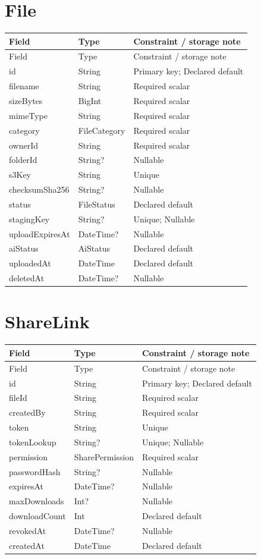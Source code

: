 \documentclass[11pt,a4paper,oneside]{report}
\begin{document}
\section{File}
\begin{longtable}{p{.31\linewidth}p{.23\linewidth}p{.36\linewidth}}\toprule Field&Type&Constraint / storage note\\\midrule\endfirsthead\toprule Field&Type&Constraint / storage note\\\midrule\endhead
id&String&Primary key; Declared default\\
filename&String&Required scalar\\
sizeBytes&BigInt&Required scalar\\
mimeType&String&Required scalar\\
category&FileCategory&Required scalar\\
ownerId&String&Required scalar\\
folderId&String?&Nullable\\
s3Key&String&Unique\\
checksumSha256&String?&Nullable\\
status&FileStatus&Declared default\\
stagingKey&String?&Unique; Nullable\\
uploadExpiresAt&DateTime?&Nullable\\
aiStatus&AiStatus&Declared default\\
uploadedAt&DateTime&Declared default\\
deletedAt&DateTime?&Nullable\\
\bottomrule\end{longtable}

\section{ShareLink}
\begin{longtable}{p{.31\linewidth}p{.23\linewidth}p{.36\linewidth}}\toprule Field&Type&Constraint / storage note\\\midrule\endfirsthead\toprule Field&Type&Constraint / storage note\\\midrule\endhead
id&String&Primary key; Declared default\\
fileId&String&Required scalar\\
createdBy&String&Required scalar\\
token&String&Unique\\
tokenLookup&String?&Unique; Nullable\\
permission&SharePermission&Required scalar\\
passwordHash&String?&Nullable\\
expiresAt&DateTime?&Nullable\\
maxDownloads&Int?&Nullable\\
downloadCount&Int&Declared default\\
revokedAt&DateTime?&Nullable\\
createdAt&DateTime&Declared default\\
\bottomrule\end{longtable}
\end{document}
